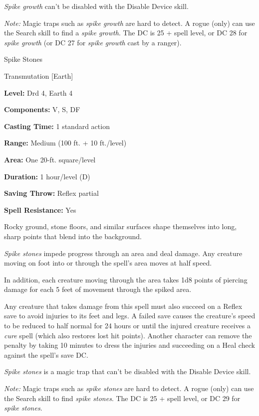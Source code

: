 \documentclass{article}
\begin{document}
\textit{Spike growth }can't be disabled with the Disable Device skill.

\textit{Note: }Magic traps such as \textit{spike growth }are hard to detect. A 
rogue (only) can use the Search skill to find a \textit{spike growth}. The DC is 
25 + spell level, or DC 28 for \textit{spike growth }(or DC 27 for \textit{spike 
growth }cast by a ranger).

\vspace{12pt}
Spike Stones

Transmutation [Earth]

\textbf{Level:} Drd 4, Earth 4

\textbf{Components:} V, S, DF

\textbf{Casting Time:} 1 standard action

\textbf{Range: }Medium (100 ft. + 10 ft./level)

\textbf{Area:} One 20-ft. square/level

\textbf{Duration:} 1 hour/level (D)

\textbf{Saving Throw:} Reflex partial

\textbf{Spell Resistance:} Yes

Rocky ground, stone floors, and similar surfaces shape themselves into long, sharp 
points that blend into the background.

\textit{Spike stones }impede progress through an area and deal damage. Any creature 
moving on foot into or through the spell's area moves at half speed.

In addition, each creature moving through the area takes 1d8 points of piercing 
damage for each 5 feet of movement through the spiked area.

Any creature that takes damage from this spell must also succeed on a Reflex save 
to avoid injuries to its feet and legs. A failed save causes the creature's speed 
to be reduced to half normal for 24 hours or until the injured creature receives 
a \textit{cure }spell (which also restores lost hit points). Another character 
can remove the penalty by taking 10 minutes to dress the injuries and succeeding 
on a Heal check against the spell's save DC.

\textit{Spike stones }is a magic trap that can't be disabled with the Disable Device 
skill.

\textit{Note: }Magic traps such as \textit{spike stones }are hard to detect. A 
rogue (only) can use the Search skill to find \textit{spike stones}. The DC is 
25 + spell level, or DC 29 for \textit{spike stones}.
\end{document}
